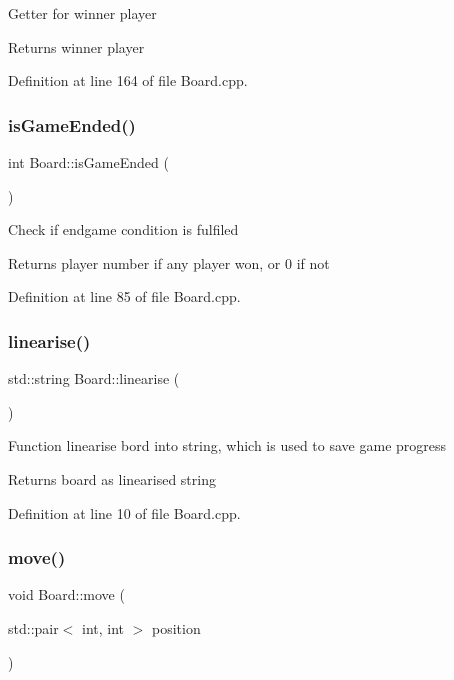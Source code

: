 Getter for winner player \begin{DoxyReturn}{Returns}
winner player 
\end{DoxyReturn}


Definition at line 164 of file Board.\+cpp.

\mbox{\label{classBoard_afadc1ddff22c3a2ee25cad41ed7e5da0}} 
\subsubsection{\texorpdfstring{is\+Game\+Ended()}{isGameEnded()}}
{\footnotesize\ttfamily int Board\+::is\+Game\+Ended (\begin{DoxyParamCaption}{ }\end{DoxyParamCaption})}

Check if endgame condition is fulfiled \begin{DoxyReturn}{Returns}
player number if any player won, or 0 if not 
\end{DoxyReturn}


Definition at line 85 of file Board.\+cpp.

\mbox{\label{classBoard_a17ee7e0130537721b492cb7ed7235974}} 
\subsubsection{\texorpdfstring{linearise()}{linearise()}}
{\footnotesize\ttfamily std\+::string Board\+::linearise (\begin{DoxyParamCaption}{ }\end{DoxyParamCaption})\hspace{0.3cm}{\ttfamily [private]}}

Function linearise bord into string, which is used to save game progress \begin{DoxyReturn}{Returns}
board as linearised string 
\end{DoxyReturn}


Definition at line 10 of file Board.\+cpp.

\mbox{\label{classBoard_a5ee56f4407f7792fe6f134a59d4af190}} 
\subsubsection{\texorpdfstring{move()}{move()}}
{\footnotesize\ttfamily void Board\+::move (\begin{DoxyParamCaption}\item[{std\+::pair$<$ int, int $>$}]{position }\end{DoxyParamCaption})}

